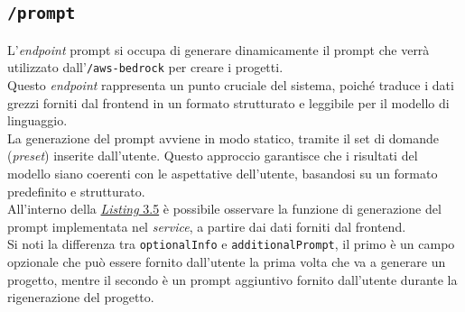 \subsection*{\texttt{/prompt}}
L’\textit{endpoint} \gls{prompt} si occupa di generare dinamicamente il \gls{prompt} che verrà utilizzato dall’\texttt{/aws-bedrock} per creare i progetti.\\
Questo \textit{endpoint} rappresenta un punto cruciale del sistema, poiché traduce i dati grezzi forniti dal \gls{frontend} in un formato strutturato e leggibile per il modello di linguaggio.\\ 

\noindent La generazione del \gls{prompt} avviene in modo statico, tramite il set di domande (\textit{preset}) inserite dall'utente. Questo approccio garantisce che i risultati del modello siano coerenti con le aspettative dell'utente, basandosi su un formato predefinito e strutturato.\\

\noindent All'interno della {\hyperref[lst:funzione-prompt]{\textit{Listing} 3.5}} è possibile osservare la funzione di generazione del \gls{prompt} implementata nel \textit{service}, a partire dai dati forniti dal \gls{frontend}.\\
Si noti la differenza tra \texttt{optionalInfo} e \texttt{additionalPrompt}, il primo è un campo opzionale che può essere fornito dall'utente la prima volta che va a generare un progetto, mentre il secondo è un \gls{prompt} aggiuntivo fornito dall'utente durante la rigenerazione del progetto.

